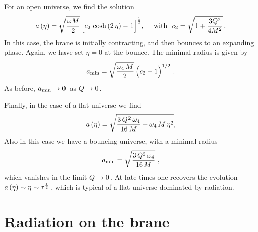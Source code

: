 \documentclass[a4paper,11pt]{article}
\begin{document}
For an open universe, we find the solution
%
\begin{equation}
a \left( \eta \right) = \sqrt{\omega M\over 2} \, \Big[ c_2 ~{\rm cosh } \left( 2 \, \eta \right)  -1 \Big]^{1\over 2}, ~~~~{\rm with}~~ c_2 
= \sqrt{1 + {3 Q^2 \over{4 M^2}}} \,.
\label{oscale}
\end{equation}
%
In this case, the brane is initially contracting, and then bounces to an
expanding phase. Again, we have set $\eta=0$ at the bounce. The minimal
radius is given by
%
\begin{equation}
a_{\rm min} = \sqrt{\frac{\omega_4 \, M}{2}} \, \Big( c_2 - 1 \Big)^{1/2} \,\,.
\end{equation}
%
As before, $a_{\rm min} \rightarrow 0\,$ as $Q \rightarrow 0\,$.

Finally, in the case of a flat universe we find
%
\begin{equation}
a \left( \eta \right) = \sqrt{{3 \, Q^2 \, \omega_4\over{16 \, M}} + \omega_4 \, M \, \eta^2},
\label{fscale}
\end{equation}
%
Also in this case we have a bouncing universe, with a minimal radius
%
\begin{equation}
a_{\rm min} = \sqrt{\frac{3 \, Q^2 \, \omega_4}{16 \, M}} \,\,,
\end{equation}
%
which vanishes in the limit $Q \rightarrow 0 \,$. At late times one
recovers the evolution $a \left( \eta \right) \sim  \eta \sim \tau^{1\over
2}\,$, which is typical of a flat universe dominated by radiation.


\section{Radiation on the brane}~\label{radio}
\end{document}
